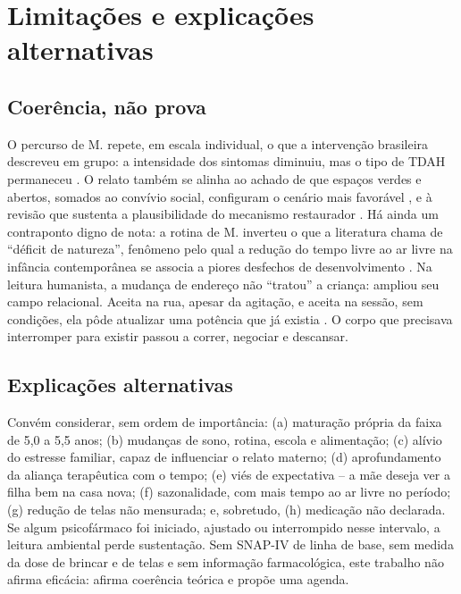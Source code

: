 \section{Limita\c{c}\~oes e explica\c{c}\~oes alternativas}

\subsection{Coer\^encia, n\~ao prova}

O percurso de M. repete, em escala individual, o que a interven\c{c}\~ao brasileira descreveu em grupo: a intensidade dos sintomas diminuiu, mas o tipo de TDAH permaneceu \cite{damasceno2025}. O relato tamb\'em se alinha ao achado de que espa\c{c}os verdes e abertos, somados ao conv\'ivio social, configuram o cen\'ario mais favor\'avel \cite{kuo2004}, e \`a revis\~ao que sustenta a plausibilidade do mecanismo restaurador \cite{hood2024}. H\'a ainda um contraponto digno de nota: a rotina de M. inverteu o que a literatura chama de ``d\'eficit de natureza'', fen\^omeno pelo qual a redu\c{c}\~ao do tempo livre ao ar livre na inf\^ancia contempor\^anea se associa a piores desfechos de desenvolvimento \cite{louv2015}. Na leitura humanista, a mudan\c{c}a de endere\c{c}o n\~ao ``tratou'' a crian\c{c}a: ampliou seu campo relacional. Aceita na rua, apesar da agita\c{c}\~ao, e aceita na sess\~ao, sem condi\c{c}\~oes, ela p\^ode atualizar uma pot\^encia que j\'a existia \cite{rogers2020}. O corpo que precisava interromper para existir passou a correr, negociar e descansar.

\subsection{Explica\c{c}\~oes alternativas}

Conv\'em considerar, sem ordem de import\^ancia: (a) matura\c{c}\~ao pr\'opria da faixa de 5,0 a 5,5 anos; (b) mudan\c{c}as de sono, rotina, escola e alimenta\c{c}\~ao; (c) al\'ivio do estresse familiar, capaz de influenciar o relato materno; (d) aprofundamento da alian\c{c}a terap\^eutica com o tempo; (e) vi\'es de expectativa -- a m\~ae deseja ver a filha bem na casa nova; (f) sazonalidade, com mais tempo ao ar livre no per\'iodo; (g) redu\c{c}\~ao de telas n\~ao mensurada; e, sobretudo, (h) medica\c{c}\~ao n\~ao declarada. Se algum psicof\'armaco foi iniciado, ajustado ou interrompido nesse intervalo, a leitura ambiental perde sustenta\c{c}\~ao. Sem SNAP-IV de linha de base, sem medida da dose de brincar e de telas e sem informa\c{c}\~ao farmacol\'ogica, este trabalho n\~ao afirma efic\'acia: afirma coer\^encia te\'orica e prop\~oe uma agenda.

